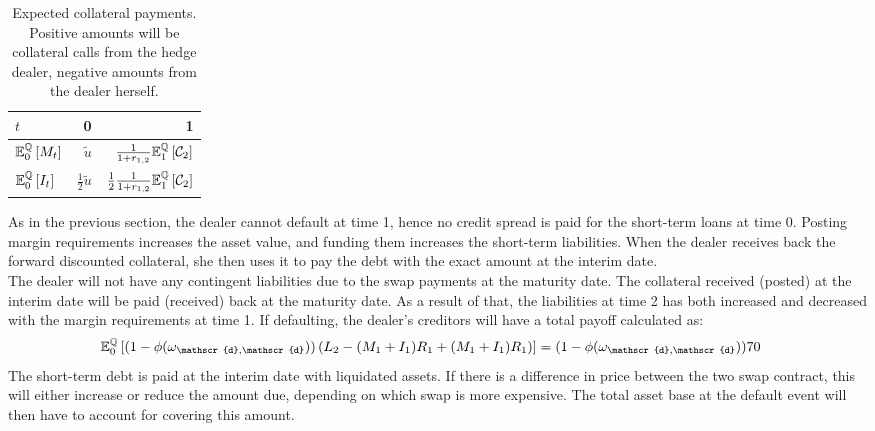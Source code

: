 \documentclass[main.tex]{subfiles}
\begin{document}
            \begin{table}[H]
                \centering
                \begin{tabular}{l|rr}
                    $t$ & 0 & 1 \\
                    \hline
                    \rule{0pt}{1.3em}
                    $\mathbb{E}_{0}^{\mathbb{Q}}\left[M_t\right]$ & $\tilde{u}$ & $\frac{1}{1+r_{1,2}}\mathbb{E}_{1}^{\mathbb{Q}}\left[\mathcal{C}_{2}\right]$ \\
                    \rule{0pt}{1.3em}
                    $\mathbb{E}_{0}^{\mathbb{Q}}\left[I_t\right]$ & $\frac{1}{2}\tilde{u}$ & $\frac{1}{2}\frac{1}{1+r_{1,2}}\mathbb{E}_{1}^{\mathbb{Q}}\left[\mathcal{C}_{2}\right]$ \\
                \end{tabular}
                \caption{
                    Expected collateral payments. 
                    Positive amounts will be collateral calls from the hedge dealer,
                    negative amounts from the dealer herself.
                }
                \label{tbl:swap-margin-postings}
            \end{table}

            As in the previous section, the dealer cannot default at time 1,
            hence no credit spread is paid for the short-term loans at time 0.
            Posting margin requirements increases the asset value,
            and funding them increases the short-term liabilities.
            When the dealer receives back the forward discounted collateral,
            she then uses it to pay the debt with the exact amount at the interim date.
            \\
            The dealer will not have any contingent liabilities due to the swap payments at the maturity date.
            The collateral received (posted) at the interim date will be paid (received) back at the maturity date.
            As a result of that,
            the liabilities at time 2 has both increased and decreased with the margin requirements at time 1.
            If defaulting, the dealer's creditors will have a total payoff calculated as:
            \begin{align}
                \mathbb{E}_{0}^{\rnmeasure}\left[
                    (1-\phi(\omega_{\mathscr{d},\mathscr{d}}))\left(
                        L_{2}
                        -(M_1+I_1)R_{1}
                        +(M_1+I_1)R_{1}
                    \right)
                \right] 
                &= (1-\phi(\omega_{\mathscr{d},\mathscr{d}}))\num{70}
            \end{align}
            The short-term debt is paid at the interim date with liquidated assets.
            If there is a difference in price between the two swap contract,
            this will either increase or reduce the amount due,
            depending on which swap is more expensive.
            The total asset base at the default event will then have to account for covering this amount. 
\end{document}
